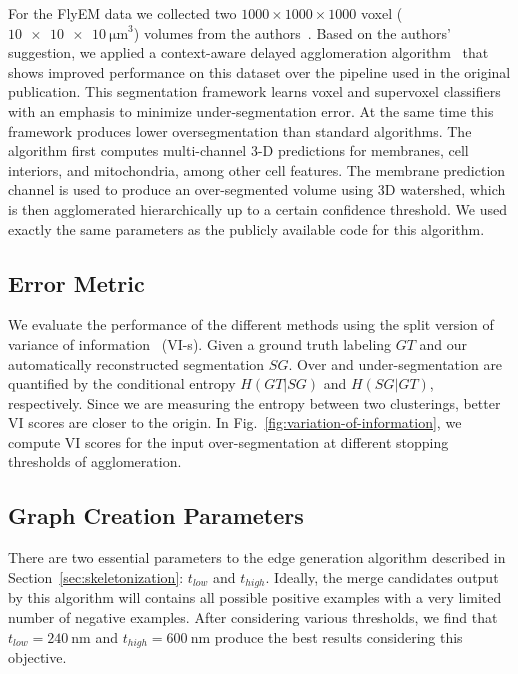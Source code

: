For the FlyEM data we collected two $1000 \times 1000 \times 1000$ voxel ($\SI[product-units=single]{10x10x10}{\micro\meter}^3$) volumes from the authors~\cite{takemura2017connectome}. Based on the authors' suggestion, we applied a context-aware delayed agglomeration algorithm~\cite{10.1371/journal.pone.0125825} that shows improved performance on this dataset over the pipeline used in the original publication. This segmentation framework learns voxel and supervoxel classifiers with an emphasis to minimize under-segmentation error. At the same time this framework produces lower oversegmentation than standard algorithms. The algorithm first computes multi-channel 3-D predictions for membranes, cell interiors, and mitochondria, among other cell features. The membrane prediction channel is used to produce an over-segmented volume using 3D watershed, which is then agglomerated hierarchically up to a certain confidence threshold. We used exactly the same parameters as the publicly available code for this algorithm.

\subsection{Error Metric}
\label{sec:variation-of-information}

We evaluate the performance of the different methods using the split version of variance of information~\cite{meila2003comparing} (VI-s). Given a ground truth labeling $GT$ and our automatically reconstructed segmentation $SG$.
Over and under-segmentation are quantified by the conditional entropy $H(GT | SG)$ and $H(SG | GT)$, respectively. Since we are measuring the entropy between two clusterings, better VI scores are closer to the origin.
In Fig.~\ref{fig:variation-of-information}, we compute VI scores for the input over-segmentation at different stopping thresholds of agglomeration.

\subsection{Graph Creation Parameters}

There are two essential parameters to the edge generation algorithm described in Section~\ref{sec:skeletonization}: $t_{low}$ and $t_{high}$. Ideally, the merge candidates output by this algorithm will contains all possible positive examples with a very limited number of negative examples. After considering various thresholds, we find that $t_{low} = \SI{240}{\nano\meter}$ and $t_{high} = \SI{600}{\nano\meter}$ produce the best results considering this objective.


